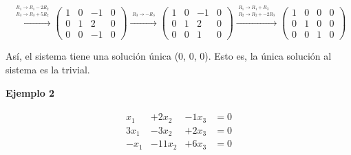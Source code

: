 \documentclass{article}
\begin{document}
\begin{equation}
    \xrightarrow{\overset{\begin{aligned} R_1 \rightarrow R_1 -2R_2\\ R_3 \rightarrow R_3 + 5R_2\end{aligned}}{}} 
    \left(\begin{array}{rrr|r}
    1 & 0 & -1 & 0 \\
    0 & 1 & 2 & 0 \\
    0 & 0 & -1 & 0
    \end{array}\right) 
    \xrightarrow{\overset{\begin{aligned} R_3 \rightarrow - R_3 \end{aligned}}{}} 
    \left(\begin{array}{rrr|r}
    1 & 0 & -1 & 0 \\
    0 & 1 & 2 & 0 \\
    0 & 0 & 1 & 0
    \end{array}\right)
    \xrightarrow{\overset{\begin{aligned} R_1 \rightarrow R_1 + R_3\\ R_2 \rightarrow R_2 + -2R_3\end{aligned}}{}} 
    \left(\begin{array}{rrr|r}
    1 & 0 & 0 & 0 \\
    0 & 1 & 0 & 0 \\
    0 & 0 & 1 & 0
    \end{array}\right)
\end{equation}

Así, el sistema tiene una solución única (0, 0, 0). Esto es, la única solución al sistema es la trivial.

\begin{large}
    \textbf{Ejemplo 2}
\end{large}

\begin{equation*}
    \begin{matrix}
        \begin{aligned}
            x_1 & +2x_2 & -1x_3 & =0\\
            3x_1 & -3x_2 & +2x_3 & =0\\
            -x_1 & -11x_2 & +6x_3 & =0
        \end{aligned}
    \end{matrix}
\end{equation*}
\end{document}
